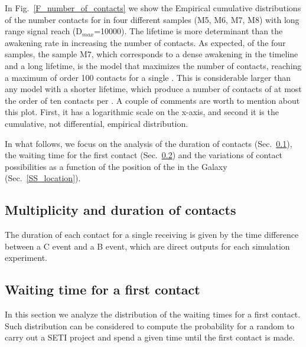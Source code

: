In Fig.~\ref{F_number_of_contacts} we show the Empirical cumulative
distributions of the number contacts for \cetis in four different
samples (M5, M6, M7, M8) with long range signal reach
(D$_{max}$=10000). 
%
The lifetime is more determinant than the awakening rate in increasing
the number of contacts.
%
As expected, of the four samples, the sample M7, which corresponds to
a dense awakening in the timeline and a long lifetime, is the model
that maximizes the number of contacts, reaching a maximum of order 100
contacts for a single \ceti.
%
This is considerable larger than any model with a shorter lifetime,
which produce a number of contacts of at most the order of ten
contacts per \ceti.
%
A couple of comments are worth to mention about this plot.
%
First, it has a logarithmic scale on the x-axis, and second it is the
cumulative, not differential, empirical distribution.
 

In what follows, we focus on the analysis of the duration of contacts
(Sec.~\ref{SS_multiplicity}), the waiting time for the first contact
(Sec.~\ref{SS_waiting}) and the
variations of contact possibilities as a function of the position of
the \ceti in the Galaxy (Sec.~\ref{SS_location}).



\subsection{Multiplicity and duration of contacts}\label{SS_multiplicity}

The duration of each contact for a single receiving \ceti is given by the
time difference between a C event and a B event, which are direct
outputs for each simulation experiment.





\subsection{Waiting time for a first contact}\label{SS_waiting}

In this section we analyze the distribution of the waiting times for
a first contact.
%
Such distribution can be considered to compute the probability for a
random \ceti to carry out a SETI project and spend a given time until
the first contact is made. 


